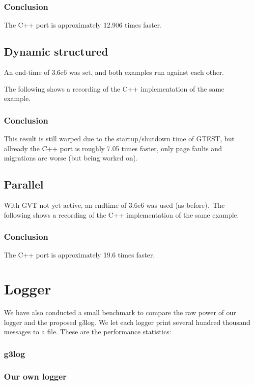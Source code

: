 \documentclass[8pt,a4paper]{report}
\begin{document}
\subsubsection{Conclusion}
The C++ port is approximately 12.906 times faster.

\subsection{Dynamic structured}
An end-time of 3.6e6 was set, and both examples run against each other.

The following shows a recording of the C++ implementation of the same example.\\

\subsubsection{Conclusion}
This result is still warped due to the startup/shutdown time of GTEST, but allready the C++ port is roughly 7.05 times faster, only page faults and migrations are worse (but being worked on).
\subsection{Parallel}
With GVT not yet active, an endtime of 3.6e6 was used (as before).\
The following shows a recording of the C++ implementation of the same example.\\

\subsubsection{Conclusion}
The C++ port is approximately 19.6 times faster.

\section{Logger}
We have also conducted a small benchmark to compare the raw power of our logger and the proposed g3log.
We let each logger print several hundred thousand messages to a file. These are the performance statistics:
\subsubsection{g3log}

\subsubsection{Our own logger}

\end{document}
